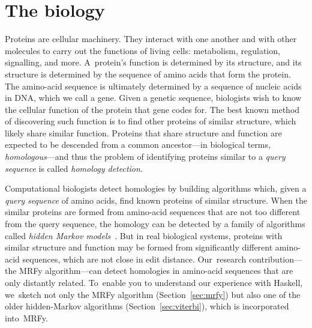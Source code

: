 \documentclass[preprint,nonatbib,blockstyle,nocopyrightspace,times]{sigplanconf}
\newcommand\secref[1]{Section~\ref{sec:#1}}
\let\cite\citep
\begin{document}
\section{The biology}

Proteins are cellular machinery. They interact with one another and with other 
molecules to carry out the functions of living cells: metabolism, regulation, 
signalling, and more.
A~protein's function is determined by its structure, 
and its structure is determined by the sequence of amino acids that
form the protein.
The amino-acid sequence is ultimately determined by a sequence of
nucleic acids in DNA, which we call a gene.
Given a genetic sequence, biologists wish to know the cellular
function of the protein that gene codes for.
The best known method of discovering such function is
to find other proteins of 
similar structure, which likely share similar function.
Proteins that share structure and function are expected to be
descended from a common ancestor---in biological terms, \emph{homologous}---and
thus
the problem of identifying proteins similar to a \textit{query sequence} is called 
\textit{homology detection}.




Computational biologists detect homologies by building 
algorithms which, given a \emph{query sequence} of amino acids,
find known proteins of similar structure.
When the similar proteins are formed from amino-acid sequences that
are not too different from the query sequence, the homology can be
detected by
a family of algorithms called 
\textit{hidden Markov models}~\cite{Eddy:1998ut}.
But in real biological systems,
proteins with similar structure and function may be formed from significantly 
different amino-acid sequences, which are not close in edit distance.
Our~research contribution---the MRFy algorithm---can detect homologies
in amino-acid sequences that are only distantly related.
%
%
To~enable you to understand our experience with Haskell,
we~sketch not only the MRFy algorithm (\secref{mrfy})
but also one of the older hidden-Markov algorithms (\secref{viterbi}),
which is incorporated into~MRFy.

\end{document}
